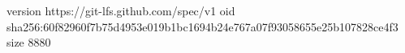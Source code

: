 version https://git-lfs.github.com/spec/v1
oid sha256:60f82960f7b75d4953e019b1bc1694b24e767a07f93058655e25b107828ce4f3
size 8880
